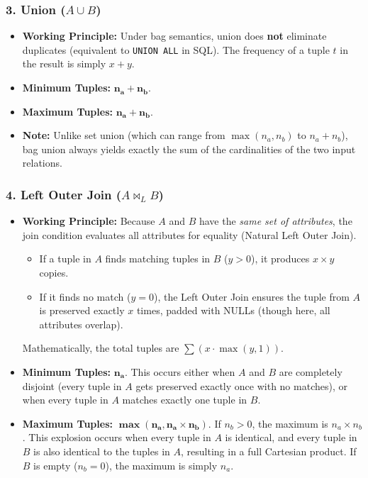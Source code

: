 \documentclass[12pt,a3paper]{article}
\begin{document}
\begin{enumerate}
\begin{tcolorbox}[enhanced,breakable,ansbox,colback=cA!4,colframe=cA,boxrule=0.8pt,arc=5pt,title={\textbf{Answer}},fonttitle=\bfseries\color{white},colbacktitle=cA]
\subsubsection*{3. Union ($A \cup B$)}
\begin{itemize}
    \item \textbf{Working Principle:} Under bag semantics, union does \textbf{not} eliminate duplicates (equivalent to \texttt{UNION ALL} in SQL). The frequency of a tuple $t$ in the result is simply $x + y$. 
    \item \textbf{Minimum Tuples:} $\mathbf{n_a + n_b}$.
    \item \textbf{Maximum Tuples:} $\mathbf{n_a + n_b}$.
    \item \textbf{Note:} Unlike set union (which can range from $\max(n_a, n_b)$ to $n_a + n_b$), bag union always yields exactly the sum of the cardinalities of the two input relations.
\end{itemize}

\subsubsection*{4. Left Outer Join ($A \bowtie_L B$)}
\begin{itemize}
    \item \textbf{Working Principle:} Because $A$ and $B$ have the \textit{same set of attributes}, the join condition evaluates all attributes for equality (Natural Left Outer Join). 
    \begin{itemize}
        \item If a tuple in $A$ finds matching tuples in $B$ ($y > 0$), it produces $x \times y$ copies.
        \item If it finds no match ($y = 0$), the Left Outer Join ensures the tuple from $A$ is preserved exactly $x$ times, padded with NULLs (though here, all attributes overlap).
    \end{itemize}
    Mathematically, the total tuples are $\sum (x \cdot \max(y, 1))$.
    \item \textbf{Minimum Tuples:} $\mathbf{n_a}$. This occurs either when $A$ and $B$ are completely disjoint (every tuple in $A$ gets preserved exactly once with no matches), or when every tuple in $A$ matches exactly one tuple in $B$.
    \item \textbf{Maximum Tuples:} $\mathbf{\max(n_a, n_a \times n_b)}$. If $n_b > 0$, the maximum is $n_a \times n_b$. This explosion occurs when every tuple in $A$ is identical, and every tuple in $B$ is also identical to the tuples in $A$, resulting in a full Cartesian product. If $B$ is empty ($n_b = 0$), the maximum is simply $n_a$.
\end{itemize}


\end{tcolorbox}
\end{enumerate}
\end{document}
